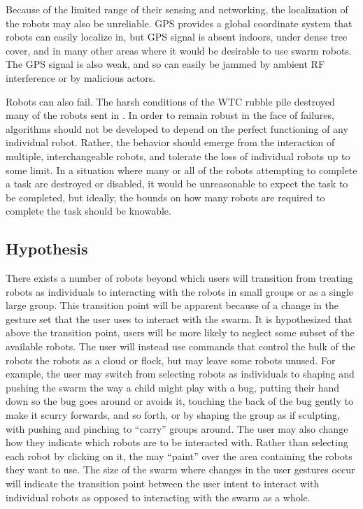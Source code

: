 \documentclass[]{article}
\begin{document}
Because of the limited range of their sensing and networking, the localization of the robots may also be unreliable. 
GPS provides a global coordinate system that robots can easily localize in, but GPS signal is absent indoors, under dense tree cover, and in many other areas where it would be desirable to use swarm robots. 
The GPS signal is also weak, and so can easily be jammed by ambient RF interference or by malicious actors. 

Robots can also fail. 
The harsh conditions of the WTC rubble pile destroyed many of the robots sent in \cite{Micire02analysisof}.
In order to remain robust in the face of failures, algorithms should not be developed to depend on the perfect functioning of any individual robot. 
Rather, the behavior should emerge from the interaction of multiple, interchangeable robots, and tolerate the loss of individual robots up to some limit. 
In a situation where many or all of the robots attempting to complete a task are destroyed or disabled, it would be unreasonable to expect the task to be completed, but ideally, the bounds on how many robots are required to complete the task should be knowable. 

\subsection{Hypothesis}

There exists a number of robots beyond which users will transition from treating robots as individuals to interacting with the robots in small groups or as a single large group. 
This transition point will be apparent because of a change in the gesture set that the user uses to interact with the swarm. 
It is hypothesized that above the transition point, users will be more likely to neglect some subset of the available robots. 
The user will instead use commands that control the bulk of the robots the robots as a cloud or flock, but may leave some robots unused. 
For example, the user may switch from selecting robots as individuals to shaping and pushing the swarm the way a child might play with a bug, putting their hand down so the bug goes around or avoids it, touching the back of the bug gently to make it scurry forwards, and so forth, or by shaping the group as if sculpting, with pushing and pinching to ``carry'' groups around. 
The user may also change how they indicate which robots are to be interacted with. 
Rather than selecting each robot by clicking on it, the may ``paint'' over the area containing the robots they want to use. 
The size of the swarm where changes in the user gestures occur will indicate the transition point between the user intent to interact with individual robots as opposed to interacting with the swarm as a whole. 
\end{document}
